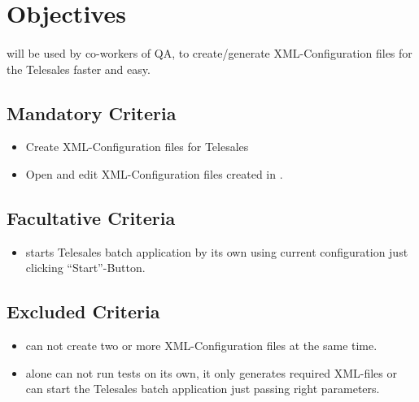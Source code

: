 \section{Objectives}

\paragraph{}\app{} will be used by co-workers of QA, to create/generate XML-Configuration files for the Telesales faster and easy.

\subsection{Mandatory Criteria}

\begin{itemize}
\item Create XML-Configuration files for Telesales
\item Open and edit XML-Configuration files created in \app{}.
\end{itemize}

\subsection{Facultative Criteria}

\begin{itemize}
\item \app{} starts Telesales batch application by its own using current configuration just clicking ``Start''-Button.
\end{itemize}

\subsection{Excluded Criteria}

\begin{itemize}
\item \app{} can not create two or more XML-Configuration files at the same time.
\item \app{} alone can not run tests on its own, it only generates required XML-files or can start the Telesales batch application just passing right parameters.
\end{itemize}
